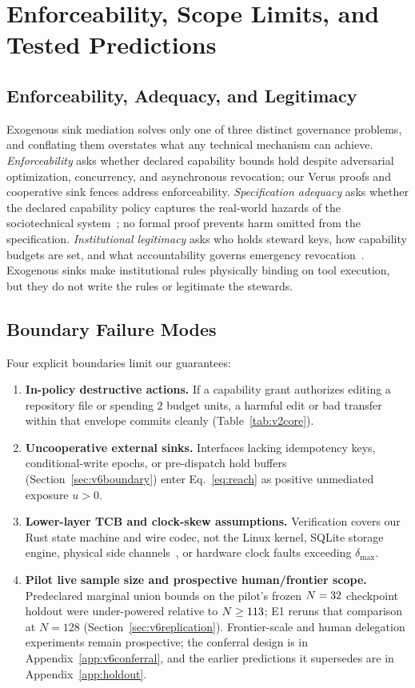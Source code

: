 \section{Enforceability, Scope Limits, and Tested Predictions}\label{sec:limits}

\subsection{Enforceability, Adequacy, and Legitimacy}

Exogenous sink mediation solves only one of three distinct governance problems, and conflating them overstates what any technical mechanism can achieve. \emph{Enforceability} asks whether declared capability bounds hold despite adversarial optimization, concurrency, and asynchronous revocation; our Verus proofs and cooperative sink fences address enforceability. \emph{Specification adequacy} asks whether the declared capability policy captures the real-world hazards of the sociotechnical system~\cite{leveson2011,normal}; no formal proof prevents harm omitted from the specification. \emph{Institutional legitimacy} asks who holds steward keys, how capability budgets are set, and what accountability governs emergency revocation~\cite{ostrom1990,iasr}. Exogenous sinks make institutional rules physically binding on tool execution, but they do not write the rules or legitimate the stewards.

\subsection{Boundary Failure Modes}

Four explicit boundaries limit our guarantees:
\begin{enumerate}
  \item \textbf{In-policy destructive actions.} If a capability grant authorizes editing a repository file or spending \(2\) budget units, a harmful edit or bad transfer within that envelope commits cleanly (Table~\ref{tab:v2core}).
  \item \textbf{Uncooperative external sinks.} Interfaces lacking idempotency keys, conditional-write epochs, or pre-dispatch hold buffers (Section~\ref{sec:v6boundary}) enter Eq.~\eqref{eq:reach} as positive unmediated exposure \(u > 0\).
  \item \textbf{Lower-layer TCB and clock-skew assumptions.} Verification covers our Rust state machine and wire codec, not the Linux kernel, SQLite storage engine, physical side channels~\cite{kocher1996}, or hardware clock faults exceeding \(\delta_{\max}\).
  \item \textbf{Pilot live sample size and prospective human/frontier scope.} Predeclared marginal union bounds on the pilot's frozen \(N = 32\) checkpoint holdout were under-powered relative to \(N \ge 113\); E1 reruns that comparison at \(N = 128\) (Section~\ref{sec:v6replication}). Frontier-scale and human delegation experiments remain prospective; the conferral design is in Appendix~\ref{app:v6conferral}, and the earlier predictions it supersedes are in Appendix~\ref{app:holdout}.
\end{enumerate}

